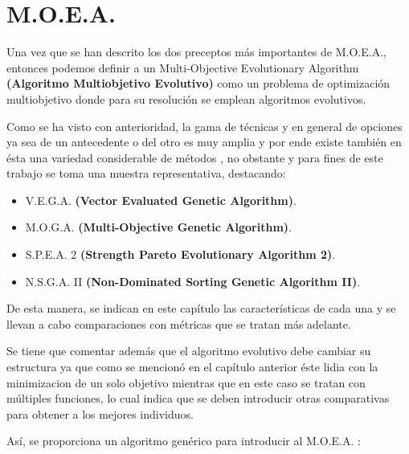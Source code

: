 \documentclass[class=report, crop=false]{standalone}
\begin{document}
\chapter {M.O.E.A.}

Una vez que se han descrito los dos preceptos más importantes 
de M.O.E.A., entonces podemos definir a un Multi-Objective 
Evolutionary Algorithm \textbf{(Algoritmo Multiobjetivo Evolutivo)} 
como un problema de optimización multiobjetivo donde para su 
resolución se emplean algoritmos evolutivos.\break

Como se ha visto con anterioridad, la gama de técnicas y en 
general de opciones ya sea de un antecedente o del otro es muy 
amplia y por ende existe también en ésta una variedad considerable 
de métodos \cite[Coello 145-146]{b5}, no obstante y para fines 
de este trabajo se toma una muestra representativa, destacando:

\begin{itemize}
\item {V.E.G.A. \textbf{(Vector Evaluated Genetic Algorithm)}.}
\item {M.O.G.A. \textbf{(Multi-Objective Genetic Algorithm)}.}
\item {S.P.E.A. 2 \textbf{(Strength Pareto Evolutionary Algorithm 2)}.}
\item {N.S.G.A. II \textbf{(Non-Dominated Sorting Genetic Algorithm II)}.}
\end{itemize}

De esta manera, se indican en este capítulo las características
de cada una y se llevan a cabo comparaciones con métricas que 
se tratan más adelante.\break

Se tiene que comentar además que el algoritmo evolutivo debe 
cambiar su estructura ya que como se mencionó en el capítulo 
anterior éste lidia con la minimizacion de un solo objetivo 
mientras que en este caso se tratan con múltiples funciones,
lo cual indica que se deben introducir otras comparativas 
para obtener a los mejores individuos.\break

Así, se proporciona un algoritmo genérico para introducir al 
M.O.E.A. \cite[Coello 147-148]{b5}:
\end{document}
